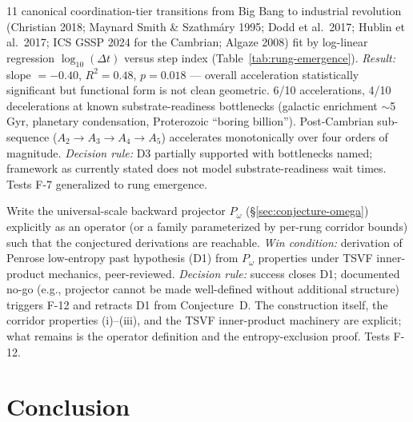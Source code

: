 \documentclass[11pt,a4paper]{article}
\begin{document}
\begin{description}[leftmargin=2em,style=nextline]
  \item[Exp 8 --- Rung-emergence geometric fit. \textbf{COMPLETED 2026-05-17, partial support}.] 11 canonical coordination-tier transitions from Big Bang to industrial revolution (Christian 2018; Maynard Smith \& Szathm\'ary 1995; Dodd et al.\ 2017; Hublin et al.\ 2017; ICS GSSP 2024 for the Cambrian; Algaze 2008) fit by log-linear regression $\log_{10}(\Delta t)$ versus step index (Table~\ref{tab:rung-emergence}). \emph{Result:} slope $= -0.40$, $R^2 = 0.48$, $p = 0.018$ — overall acceleration statistically significant but functional form is not clean geometric. 6/10 accelerations, 4/10 decelerations at known substrate-readiness bottlenecks (galactic enrichment $\sim$5\,Gyr, planetary condensation, Proterozoic ``boring billion''). Post-Cambrian sub-sequence ($A_2 \to A_3 \to A_4 \to A_5$) accelerates monotonically over four orders of magnitude. \emph{Decision rule:} D3 partially supported with bottlenecks named; framework as currently stated does not model substrate-readiness wait times. Tests F-7 generalized to rung emergence.
  \item[Exp 9 --- Formal $P_\omega$ specification (open).] Write the universal-scale backward projector $P_\omega$ (\S\ref{sec:conjecture-omega}) explicitly as an operator (or a family parameterized by per-rung corridor bounds) such that the conjectured derivations are reachable. \emph{Win condition:} derivation of Penrose low-entropy past hypothesis (D1) from $P_\omega$ properties under TSVF inner-product mechanics, peer-reviewed. \emph{Decision rule:} success closes D1; documented no-go (e.g., projector cannot be made well-defined without additional structure) triggers F-12 and retracts D1 from Conjecture~D. The construction itself, the corridor properties (i)--(iii), and the TSVF inner-product machinery are explicit; what remains is the operator definition and the entropy-exclusion proof. Tests F-12.
\end{description}

\section{Conclusion}
\label{sec:conclusion}
\end{document}
